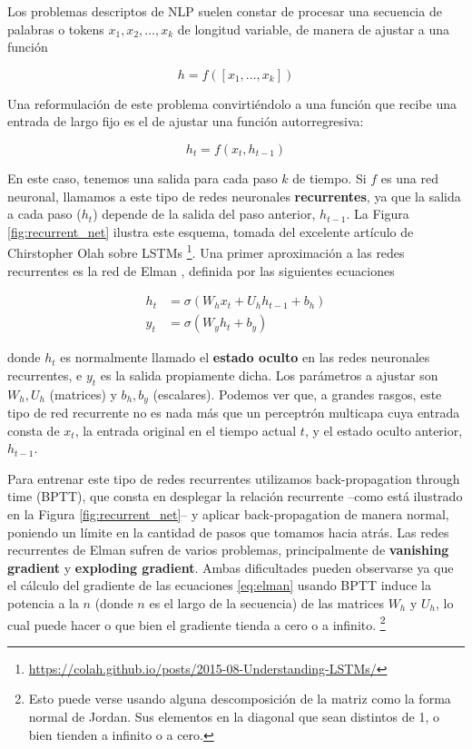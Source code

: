 Los problemas descriptos de NLP suelen constar de procesar una secuencia de palabras o tokens $x_1, x_2, \ldots, x_k$ de longitud variable, de manera de ajustar a una función

\begin{equation*}
    h = f([x_1, \ldots, x_k])
\end{equation*}

Una reformulación de este problema convirtiéndolo a una función que recibe una entrada de largo fijo es el de ajustar una función autorregresiva:

\begin{equation*}
    h_t = f(x_t, h_{t-1})
\end{equation*}

\noindent En este caso, tenemos una salida para cada paso $k$ de tiempo. Si $f$ es una red neuronal, llamamos a este tipo de redes neuronales \textbf{recurrentes}, ya que la salida a cada paso ($h_t$) depende de la salida del paso anterior, $h_{t-1}$. La Figura \ref{fig:recurrent_net}  ilustra este esquema, tomada del excelente artículo de Chirstopher Olah sobre LSTMs \footnote{\url{https://colah.github.io/posts/2015-08-Understanding-LSTMs/}}. Una primer aproximación a las redes recurrentes es la red de Elman \cite{elman1990finding}, definida por las siguientes ecuaciones

\begin{align}
h_t &= \sigma(W_h x_t + U_h h_{t-1} + b_h) \\
y_t &= \sigma(W_y h_t + b_y)
\label{eq:elman}
\end{align}

\noindent donde $h_t$ es normalmente llamado el \textbf{estado oculto} en las redes neuronales recurrentes, e $y_t$ es la salida propiamente dicha. Los parámetros a ajustar son $W_h, U_h$ (matrices) y $b_h, b_y$ (escalares). Podemos ver que, a grandes rasgos, este tipo de red recurrente no es nada más que un perceptrón multicapa cuya entrada consta de $x_t$, la entrada original en el tiempo actual $t$, y el estado oculto anterior, $h_{t-1}$.

Para entrenar este tipo de redes recurrentes utilizamos back-propagation through time (BPTT), que consta en desplegar la relación recurrente --como está ilustrado en la Figura \ref{fig:recurrent_net}-- y aplicar back-propagation de manera normal, poniendo un límite en la cantidad de pasos que tomamos hacia atrás. Las redes recurrentes de Elman sufren de varios problemas, principalmente de \textbf{vanishing gradient} y \textbf{exploding gradient}. Ambas dificultades pueden observarse ya que el cálculo del gradiente de las ecuaciones \ref{eq:elman} usando BPTT induce la potencia a la $n$ (donde $n$ es el largo de la secuencia) de las matrices $W_h$ y $U_h$, lo cual puede hacer o que bien el gradiente tienda a cero o a infinito. \footnote{ Esto puede verse usando alguna descomposición de la matriz como la forma normal de Jordan. Sus elementos en la diagonal que sean distintos de 1, o bien tienden a infinito o a cero.}

